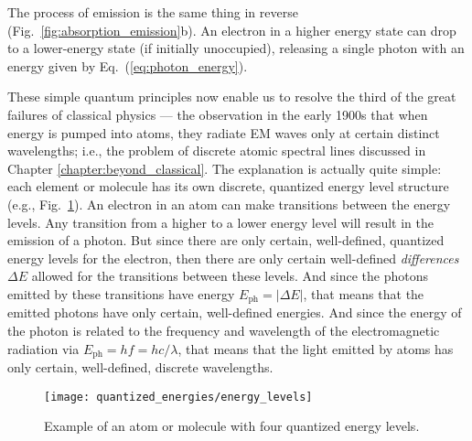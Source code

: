 The process of emission is the same thing in reverse 
(Fig.~\ref{fig:absorption_emission}b). An electron in 
a higher energy state can drop to a lower-energy state (if initially
unoccupied), releasing a single photon with an energy given by
Eq.~(\ref{eq:photon_energy}).

These simple quantum principles now enable us to resolve the third of
the great failures of classical physics --- the observation in the early
1900s that when energy is pumped into atoms, they radiate EM waves only
at certain distinct wavelengths; i.e., the problem of discrete atomic
spectral lines discussed in Chapter \ref{chapter:beyond_classical}. The
explanation is actually quite simple: each element or molecule
has its own discrete, quantized energy level structure (e.g.,
Fig.~\ref{fig:energy_levels}). An electron in an atom can make transitions
between the energy levels.  Any transition from a higher to a lower
energy level will result in the emission of a photon. But since there are
only certain, well-defined, quantized energy levels for the electron,
then there are only certain well-defined {\it differences} $\Delta E$
allowed for the transitions between these levels. And since the photons
emitted by these transitions have energy $E_\text{ph} = |\Delta E|$,
that means that the emitted photons have only certain, well-defined
energies. And since the energy of the photon is related to the frequency
and wavelength of the electromagnetic radiation via $E_\text{ph} = hf =
hc/\lambda$, that means that the light emitted by atoms has only certain,
well-defined, discrete wavelengths.

\begin{figure}
\begin{center}
\texttt{[image: quantized\_energies/energy\_levels]}
\end{center}
\caption{Example of an atom or molecule with four quantized energy
levels.}
\label{fig:energy_levels}
\end{figure}
\newpage

